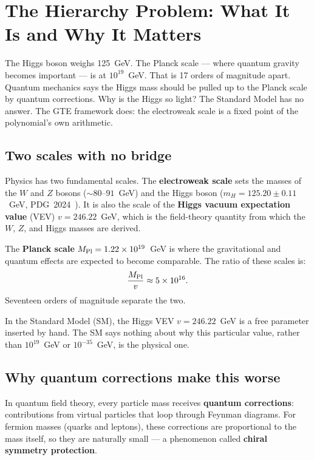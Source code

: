 \documentclass[11pt,a4paper]{article}
\newcommand{\term}[1]{\textbf{#1}}
\begin{document}
\section{The Hierarchy Problem: What It Is and Why It Matters}
\label{sec:problem}

\begin{tcolorbox}[colback=boxblue,colframe=blue!40!black,title=The question in one paragraph]
The Higgs boson weighs 125~GeV.
The Planck scale --- where quantum gravity becomes important --- is at
$10^{19}$~GeV.
That is 17 orders of magnitude apart.
Quantum mechanics says the Higgs mass should be pulled up to the Planck
scale by quantum corrections.
Why is the Higgs so light?
The Standard Model has no answer.
The GTE framework does: the electroweak scale is a fixed point of the
polynomial's own arithmetic.
\end{tcolorbox}

\subsection{Two scales with no bridge}

Physics has two fundamental scales.
The \term{electroweak scale} sets the masses of the $W$ and $Z$ bosons
($\sim 80$--$91$~GeV) and the Higgs boson ($m_H = 125.20 \pm 0.11$~GeV,
PDG~2024~\cite{SpivackGTECompleteFramework}).
It is also the scale of the \term{Higgs vacuum expectation value} (VEV)
$v = 246.22$~GeV, which is the field-theory quantity from which the
$W$, $Z$, and Higgs masses are derived.

The \term{Planck scale} $M_{\rm Pl} = 1.22 \times 10^{19}$~GeV is where
the gravitational and quantum effects are expected to become comparable.
The ratio of these scales is:
\[
  \frac{M_{\rm Pl}}{v} \approx 5 \times 10^{16}.
\]
Seventeen orders of magnitude separate the two.

In the Standard Model (SM), the Higgs VEV $v = 246.22$~GeV is a free parameter
inserted by hand.
The SM says nothing about why this particular value, rather than
$10^{19}$~GeV or $10^{-35}$~GeV, is the physical one.

\subsection{Why quantum corrections make this worse}

In quantum field theory, every particle mass receives \term{quantum corrections}:
contributions from virtual particles that loop through Feynman diagrams.
For fermion masses (quarks and leptons), these corrections are proportional
to the mass itself, so they are naturally small --- a phenomenon called
\term{chiral symmetry protection}.
\end{document}
